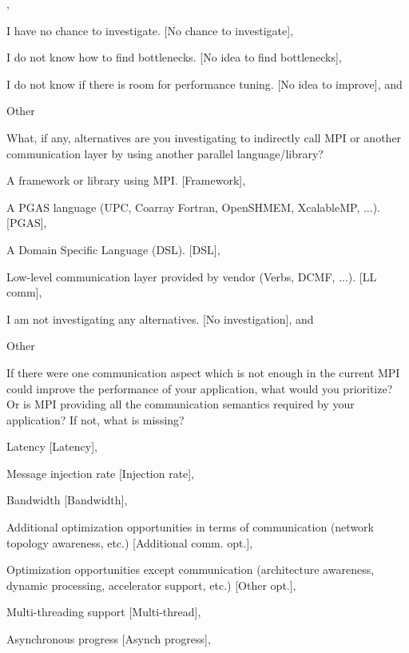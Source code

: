 \documentclass[preprint,5p,times]{elsarticle}
\begin{document}
{{\begin{description}
\begin{inparaenum},
    \item I have no chance to investigate.
      [No chance to investigate],
    \item I do not know how to find bottlenecks.
      [No idea to find bottlenecks],
    \item I do not know if there is room for performance tuning.
      [No idea to improve], and
    \item Other
    \end{inparaenum}
  \item[Q24*:] What, if any, alternatives are you investigating to
    indirectly call MPI or another communication layer by using another
    parallel language/library?
    \begin{inparaenum}[{\bf C}1)]
    \item A framework or library using MPI. [Framework],
    \item A PGAS language (UPC, Coarray Fortran, OpenSHMEM, XcalableMP,
      ...). [PGAS],
    \item A Domain Specific Language (DSL). [DSL],
    \item Low-level communication layer provided by vendor (Verbs, DCMF,
      ...). [LL comm],
    \item I am not investigating any alternatives. [No investigation], and
    \item Other
    \end{inparaenum}
  \item[Q25:] If there were one communication aspect which is not enough
    in the current MPI could improve the performance of your application,
    what would you prioritize? Or is MPI providing all the communication
    semantics required by your application? If not, what is missing?
    \begin{inparaenum}[{\bf C}1)]
    \item Latency [Latency],
    \item Message injection rate [Injection rate],
    \item Bandwidth [Bandwidth],
    \item Additional optimization opportunities in terms of communication
      (network topology awareness, etc.) [Additional comm. opt.],
    \item Optimization opportunities except communication (architecture
      awareness, dynamic processing, accelerator support, etc.) [Other opt.],
    \item Multi-threading support [Multi-thread],
    \item Asynchronous progress [Asynch progress],

\end{inparaenum}
\end{description}}}
\end{document}
